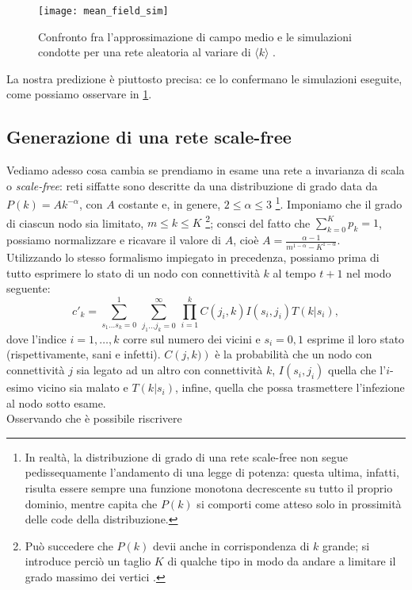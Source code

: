 \begin{figure}[t]
		\begin{center}
			\texttt{[image: mean\_field\_sim]}
			\caption{Confronto fra l'approssimazione di campo medio e le simulazioni condotte per una rete aleatoria al variare di $ \langle k \rangle $ \cite{Bagnoli2014} .}
			\label{fig:sim}
		\end{center}
\end{figure}
La nostra predizione è piuttosto precisa: ce lo confermano le simulazioni eseguite, come possiamo osservare in \cref{fig:sim}.

\subsection{Generazione di una rete scale-free}
Vediamo adesso cosa cambia se prendiamo in esame una rete a invarianza di scala o \emph{scale-free}: reti siffatte sono descritte da una distribuzione di grado data da $ P\left(k\right) = A k^{-\alpha} $, con $ A $ costante e, in genere, $ 2 \leq \alpha \leq 3 $ \footnote{In realtà, la distribuzione di grado di una rete scale-free non segue pedissequamente l'andamento di una legge di potenza: questa ultima, infatti, risulta essere sempre una funzione monotona decrescente su tutto il proprio dominio, mentre capita che $ P\left(k\right) $ si comporti come atteso solo in prossimità delle code della distribuzione.}. 
Imponiamo che il grado di ciascun nodo sia limitato, $ m \leq k \leq K $ \footnote{Può succedere che $ P\left(k\right)$ devii anche in corrispondenza di $ k $ grande; si introduce perciò un taglio $ K $ di qualche tipo in modo da andare a limitare il grado massimo dei vertici \cite{Newman}.}; 
consci del fatto che $ \sum_{k = 0}^K p_k = 1 $, possiamo normalizzare e ricavare il valore di $ A $, cioè $ A = \tfrac{ \alpha - 1}{m^{1 - \alpha} - K^{1 - \alpha}} $. \\ Utilizzando lo stesso formalismo impiegato in precedenza, possiamo prima di tutto esprimere lo stato di un nodo con connettività $ k $ al tempo $ t + 1 $ nel modo seguente:
\begin{equation}
	c'_k = \sum_{s_1 \dots s_k = 0}^1 \, \sum_{j_1 \dots j_k = 0}^ \infty \, \prod_{i = 1}^k C\left(j_i,k\right) I\left(s_i, j_i\right) T\left(k|s_i\right),
\end{equation}
dove l'indice $ i = 1, \dots, k $ corre sul numero dei vicini e $ s_i = 0, 1 $ esprime il loro stato (rispettivamente, sani e infetti). $ C\left(j,k)\right) $ è la probabilità che un nodo con connettività $ j $ sia legato ad un altro con connettività $ k $, $ I\left(s_i, j_i\right) $ quella che l'$ i $-esimo vicino sia malato e $ T\left(k|s_i\right) $, infine, quella che possa trasmettere l'infezione al nodo sotto esame. \\ Osservando che è possibile riscrivere
